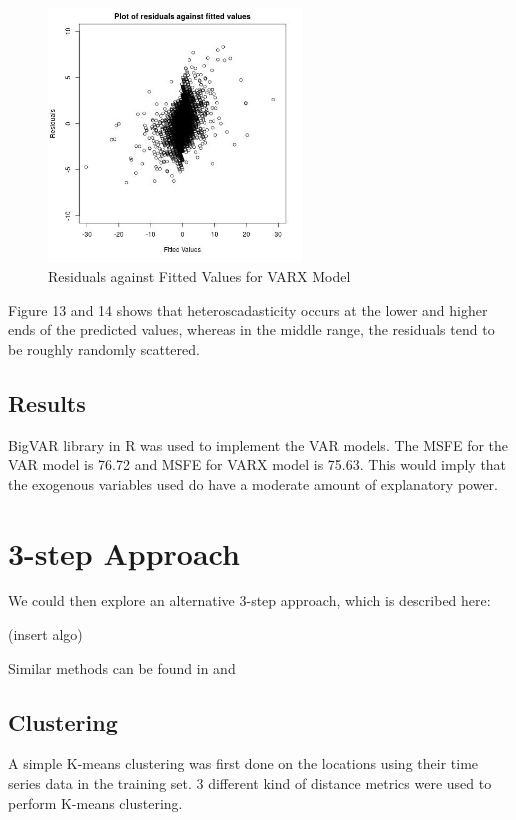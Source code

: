 \documentclass[12pt, letterpaper] {article}
\begin{document}
\begin{figure}[H]
    \centering
    \includegraphics[width=0.6\textwidth, height=0.3\textheight]{Images/Full_VARX_diff_resids_vs_values.jpg}
    \caption{Residuals against Fitted Values for VARX Model}
    \label{fig:Residuals against Fitted Values for VARX Model}
\end{figure}

Figure 13 and 14 shows that heteroscadasticity occurs at the lower and higher ends of the predicted values, whereas in the middle range, the residuals tend to be roughly randomly scattered.

\subsection{Results}
BigVAR library in R was used to implement the VAR models. The MSFE for the VAR model is 76.72 and MSFE for VARX model is 75.63. This would imply that the exogenous variables used do have a moderate amount of explanatory power. 

\section{3-step Approach}

We could then explore an alternative 3-step approach, which is described here:

(insert algo)


\noindent Similar methods can be found in \cite{Paul2015} and \cite{Chi2014}

\noindent 
\subsection{Clustering}

A simple K-means clustering was first done on the locations using their time series data in the training set. 3 different kind of distance metrics were used to perform K-means clustering. 
\end{document}
